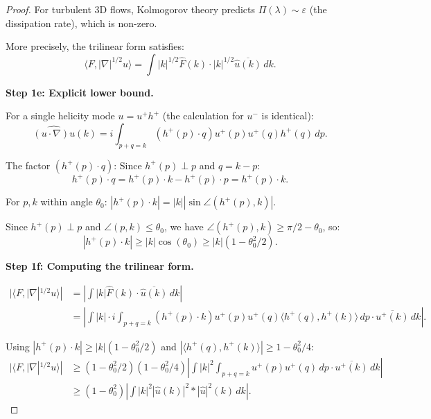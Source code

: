 \documentclass[11pt]{article}
\theoremstyle{definition}
\begin{document}
\begin{proof}
For turbulent 3D flows, Kolmogorov theory predicts $\Pi(\lambda) \sim \varepsilon$ (the dissipation rate), which is non-zero.

More precisely, the trilinear form satisfies:
\begin{equation}
\langle F, |\nabla|^{1/2} u \rangle = \int |k|^{1/2} \hat{F}(k) \cdot |k|^{1/2} \overline{\hat{u}(k)} \, dk.
\end{equation}

\textbf{Step 1e: Explicit lower bound.}

For a single helicity mode $u = u^+ h^+$ (the calculation for $u^-$ is identical):
\begin{equation}
\widehat{(u \cdot \nabla)u}(k) = i \int_{p+q=k} (h^+(p) \cdot q) u^+(p) u^+(q) h^+(q) \, dp.
\end{equation}

The factor $(h^+(p) \cdot q)$: Since $h^+(p) \perp p$ and $q = k - p$:
\begin{equation}
h^+(p) \cdot q = h^+(p) \cdot k - h^+(p) \cdot p = h^+(p) \cdot k.
\end{equation}

For $p, k$ within angle $\theta_0$: $|h^+(p) \cdot k| = |k| |\sin\angle(h^+(p), k)|$.

Since $h^+(p) \perp p$ and $\angle(p, k) \leq \theta_0$, we have $\angle(h^+(p), k) \geq \pi/2 - \theta_0$, so:
\begin{equation}
|h^+(p) \cdot k| \geq |k| \cos(\theta_0) \geq |k|(1 - \theta_0^2/2).
\end{equation}

\textbf{Step 1f: Computing the trilinear form.}

\begin{align}
|\langle F, |\nabla|^{1/2} u \rangle| &= \left| \int |k| \hat{F}(k) \cdot \overline{\hat{u}(k)} \, dk \right| \\
&= \left| \int |k| \cdot i \int_{p+q=k} (h^+(p) \cdot k) u^+(p) u^+(q) \langle h^+(q), h^+(k) \rangle \, dp \cdot \overline{u^+(k)} \, dk \right|.
\end{align}

Using $|h^+(p) \cdot k| \geq |k|(1 - \theta_0^2/2)$ and $|\langle h^+(q), h^+(k)\rangle| \geq 1 - \theta_0^2/4$:
\begin{align}
|\langle F, |\nabla|^{1/2} u \rangle| &\geq (1 - \theta_0^2/2)(1 - \theta_0^2/4) \left| \int |k|^2 \int_{p+q=k} u^+(p) u^+(q) \, dp \cdot \overline{u^+(k)} \, dk \right| \\
&\geq (1 - \theta_0^2) \left| \int |k|^2 |\hat{u}(k)|^2 \ast |\hat{u}|^2(k) \, dk \right|.
\end{align}


\end{proof}
\end{document}
